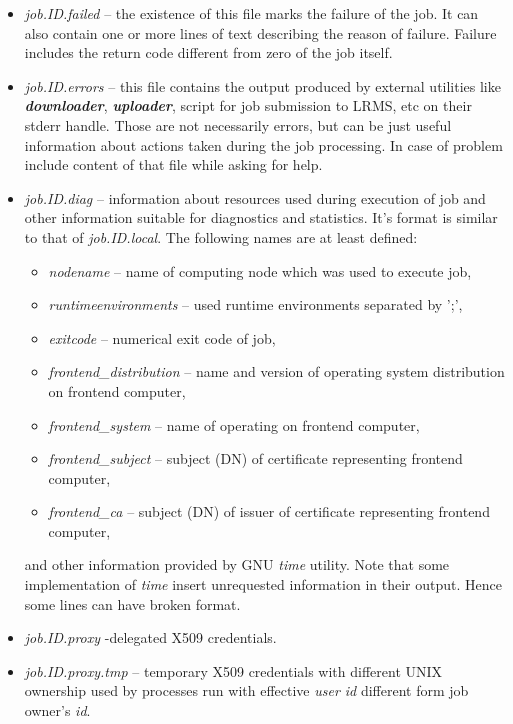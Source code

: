 \documentclass{article}                            %
\begin{document}
\begin{itemize}
\item \textit{job.ID.failed} -- the existence of this file marks the failure
of the job. It can also contain one or more lines of text describing
the reason of failure. Failure includes the return code different
from zero of the job itself.
\item \textit{job.ID.errors} -- this file contains the output produced by
external utilities like \textbf{\textit{downloader}}, \textbf{\textit{uploader}},
script for job submission to LRMS, etc on their stderr handle. Those
are not necessarily errors, but can be just useful information about
actions taken during the job processing. In case of problem include
content of that file while asking for help.
\item \textit{job.ID.diag} -- information about resources used during execution
of job and other information suitable for diagnostics and statistics.
It's format is similar to that of \textit{job.ID.local}. The following
names are at least defined:
\begin{itemize}
\item \textit{nodename} -- name of computing node which was used to execute
job,
\item \textit{runtimeenvironments} -- used runtime environments separated
by ';',
\item \textit{exitcode} -- numerical exit code of job,
\item \textit{frontend\_distribution} -- name and version of operating system
distribution on frontend computer,
\item \textit{frontend\_system} -- name of operating on frontend computer,
\item \textit{frontend\_subject} -- subject (DN) of certificate representing
frontend computer,
\item \textit{frontend\_ca} -- subject (DN) of issuer of certificate representing
frontend computer,
\end{itemize}
and other information provided by GNU \emph{time} utility. Note that
some implementation of \emph{time} insert unrequested information
in their output. Hence some lines can have broken format.
\item \textit{job.ID.proxy} -delegated X509 credentials.
\item \textit{job.ID.proxy.tmp} -- temporary X509 credentials with different
UNIX ownership used by processes run with effective \emph{user id}
different form job owner's \emph{id}.
\end{itemize}
\end{document}
